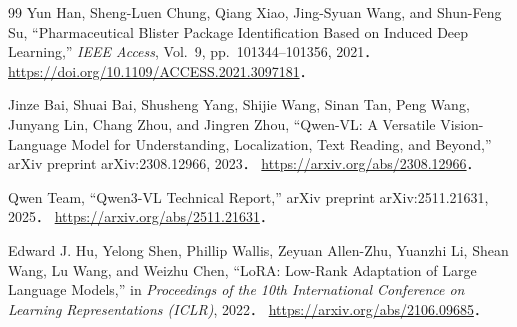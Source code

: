 \documentclass[dvipdfmx]{jsarticle}
\begin{document}
\begin{thebibliography}{99}
Yun Han, Sheng-Luen Chung, Qiang Xiao, Jing-Syuan Wang, and Shun-Feng Su,
``Pharmaceutical Blister Package Identification Based on Induced Deep Learning,''
\textit{IEEE Access}, Vol.~9, pp.~101344--101356, 2021．
\url{https://doi.org/10.1109/ACCESS.2021.3097181}．

Jinze Bai, Shuai Bai, Shusheng Yang, Shijie Wang, Sinan Tan, Peng Wang, Junyang Lin, Chang Zhou, and Jingren Zhou,
``Qwen-VL: A Versatile Vision-Language Model for Understanding, Localization, Text Reading, and Beyond,''
arXiv preprint arXiv:2308.12966, 2023．
\url{https://arxiv.org/abs/2308.12966}．

Qwen Team,
``Qwen3-VL Technical Report,''
arXiv preprint arXiv:2511.21631, 2025．
\url{https://arxiv.org/abs/2511.21631}．

Edward J. Hu, Yelong Shen, Phillip Wallis, Zeyuan Allen-Zhu, Yuanzhi Li, Shean Wang, Lu Wang, and Weizhu Chen,
``LoRA: Low-Rank Adaptation of Large Language Models,''
in \textit{Proceedings of the 10th International Conference on Learning Representations (ICLR)}, 2022．
\url{https://arxiv.org/abs/2106.09685}．
\end{thebibliography}
\end{document}
